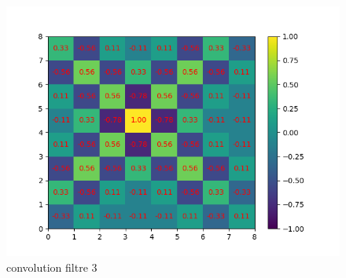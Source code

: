 \begin{figure}[h]
        \includegraphics[width=\textwidth]{img/cnn_exemple/cross/convolution_filtre_3.png}
        \caption{convolution filtre 3}
    \endminipage
\end{figure}

